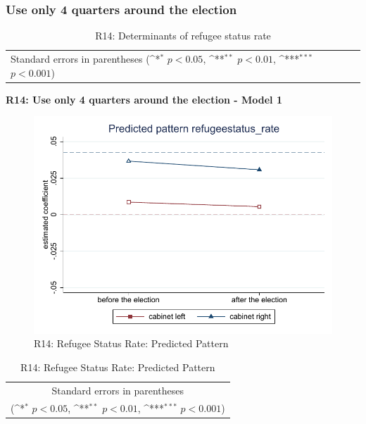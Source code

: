 \documentclass[10pt,a4paper]{scrartcl}
\begin{document}


\clearpage
\FloatBarrier
\subsubsection{Use only 4 quarters around the election}
\begin{table}[!ht]\centering
	\renewcommand{\arraystretch}{1.25}
	\small
	\def\sym#1{\ifmmode^{#1}\else\(^{#1}\)\fi}
	\caption{R14: Determinants of refugee status rate}
	\begin{tabular}{l*{3}{c}}
		\hline\hline
		
		\hline\hline
		\multicolumn{4}{l}{\footnotesize Standard errors in parentheses (\sym{*} \(p<0.05\), \sym{**} \(p<0.01\), \sym{***} \(p<0.001\))}\\
	\end{tabular}
\end{table}

\clearpage
\textbf{R14: Use only 4 quarters around the election - Model 1}
\begin{figure}[!ht]
	\centering
	\includegraphics[width=1\textwidth]{figures_edited/refugeestatus_rate_graph1_R14.pdf}
	\caption{R14: Refugee Status Rate: Predicted Pattern}
\end{figure}

\begin{table}[!ht]\centering
	\renewcommand{\arraystretch}{1.25}
	\def\sym#1{\ifmmode^{#1}\else\(^{#1}\)\fi}
	\caption{R14: Refugee Status Rate: Predicted Pattern}
	\begin{tabular}{l*{2}{c}}
		\hline\hline
		
		\hline\hline
		\multicolumn{3}{c}{\footnotesize Standard errors in parentheses} \\
		\multicolumn{3}{c}{\footnotesize (\sym{*} \(p<0.05\), \sym{**} \(p<0.01\), \sym{***} \(p<0.001\))}\\
	\end{tabular}
\end{table}
\end{document}
